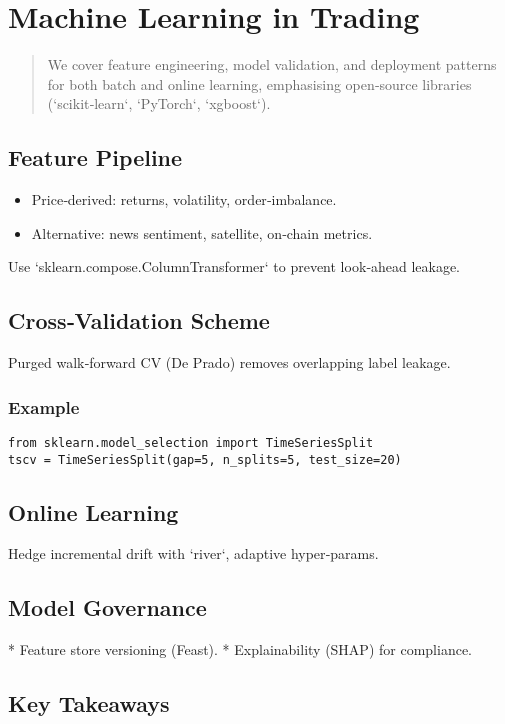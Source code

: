 \chapter{Machine Learning in Trading}\label{ch:ml}

\begin{abstract}
We cover feature engineering, model validation, and deployment patterns
for both batch and online learning, emphasising open‑source libraries
(`scikit‑learn`, `PyTorch`, `xgboost`).
\end{abstract}

\section{Feature Pipeline}

\begin{itemize}
  \item Price‐derived: returns, volatility, order‑imbalance.
  \item Alternative: news sentiment, satellite, on‑chain metrics.
\end{itemize}

Use `sklearn.compose.ColumnTransformer` to prevent look‑ahead leakage.

\section{Cross‑Validation Scheme}

Purged walk‑forward CV (De Prado) removes overlapping label leakage.

\subsection*{Example}

\begin{verbatim}
from sklearn.model_selection import TimeSeriesSplit
tscv = TimeSeriesSplit(gap=5, n_splits=5, test_size=20)
\end{verbatim}

\section{Online Learning}

Hedge incremental drift with `river`, adaptive hyper‑params.

\section{Model Governance}

* Feature store versioning (Feast).  
* Explainability (SHAP) for compliance.

\section*{Key Takeaways}
